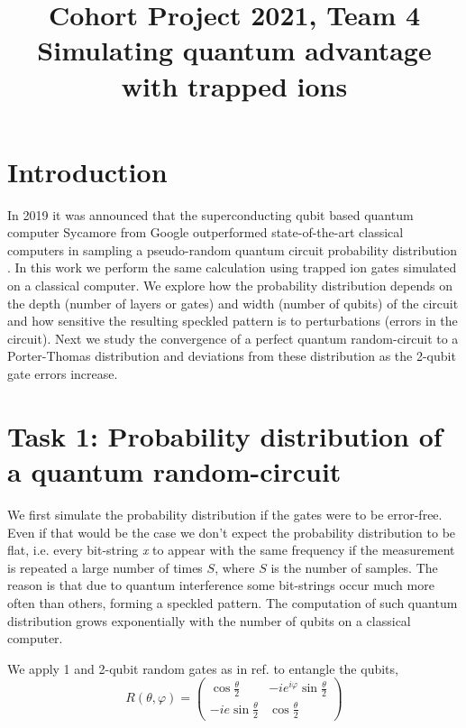 \documentclass{article}
\title{Cohort Project 2021, Team 4 \\ Simulating quantum advantage with trapped ions }
\author{}
\date{}
\begin{document}
\maketitle

\section{Introduction}

In 2019 it was announced that the superconducting qubit based quantum computer Sycamore from Google outperformed state-of-the-art classical computers in sampling a pseudo-random quantum circuit probability distribution \cite{Martinis19}.  In this work we perform the same calculation using trapped ion gates simulated on a classical computer.  We explore how the probability distribution depends on the depth (number of layers or gates) and width (number of qubits) of the circuit and how sensitive the resulting speckled pattern is to perturbations (errors in the circuit). 
Next we study the convergence of a perfect quantum random-circuit to a Porter-Thomas distribution and deviations from these distribution as the 2-qubit gate errors increase. 



\section{Task 1: Probability distribution of a quantum random-circuit }

We first simulate the probability distribution if the gates were to be error-free. Even if that would be the case we don't expect the probability distribution to be flat, i.e. every bit-string {\it x} to  appear with the same frequency if the measurement is repeated a large number of times $S$, where $S$ is the number of samples. The reason is that due to quantum interference some bit-strings occur much more often than others, forming a speckled pattern. The computation of such quantum distribution grows exponentially with the number of qubits on a classical computer.

We apply 1 and 2-qubit random gates as in ref. \cite{Martinis19} to entangle the qubits,
\begin{equation}
R(\theta,\varphi)=
\begin{pmatrix}
\cos\frac{\theta}{2} & -ie^{i\varphi}\sin\frac{\theta}{2} \\
-ie \sin\frac{\theta}{2} & \cos\frac{\theta}{2}
\end{pmatrix}
\end{equation}
\end{document}

